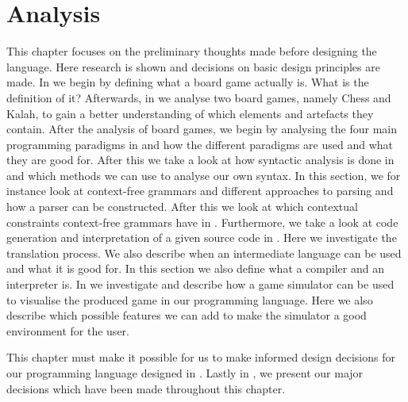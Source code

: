 \chapter{Analysis}
\label{chap:analysis}

This chapter focuses on the preliminary thoughts made before designing
the language. Here research is shown and decisions on basic design
principles are made. In  we begin by
defining what a board game actually is. What is the definition
of it? Afterwards, in  we analyse two
board games, namely Chess and Kalah, to gain a better understanding
of which elements and artefacts they contain. After the analysis
of board games, we begin by analysing the four main programming
paradigms in  and how the different paradigms
are used and what they are good for. After this we take a look at
how syntactic analysis is done in 
and which methods we can use to analyse our own syntax. In this
section, we for instance look at context-free grammars and different
approaches to parsing and how a parser can be constructed. After
this we look at which contextual constraints context-free grammars
have in . Furthermore, we take a
look at code generation and interpretation of a given source code in
. Here we investigate the
translation process. We also describe when an intermediate language can
be used and what it is good for. In this section we also define what a
compiler and an interpreter is. In  we investigate
and describe how a game simulator can be used to visualise the produced
game in our programming language. Here we also describe which possible
features we can add to make the simulator a good environment for the
user.

This chapter must make it possible for us to make informed
design decisions for our programming language designed in
. Lastly in ,
we present our major decisions which have been made throughout this
chapter.










